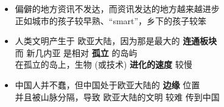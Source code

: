 \begin{preview}
\begin{minipage}{\textwidth}
\begin{itemize}
\begin{equation}
		\nonumber
		\end{equation}
	\item 偏僻的地方资讯不发达，而资讯发达的地方越来越进步 \\
		正如城市的孩子较早熟、``smart''，乡下的孩子较笨
	\item 人类文明产生于 欧亚大陆，因为那是最大的 \textbf{连通板块} \\
		而 新几内亚 是相对 \textbf{孤立} 的岛屿 \\
		在孤立的岛上，生物 (或技术) \textbf{进化的速度} 较慢
	\item 中国人并不蠢，但中国处于欧亚大陆的 \textbf{边缘} 位置 \\
		并且被山脉分隔，导致 欧亚大陆的文明 较难 传到中国
\end{itemize}

\end{minipage}
\end{preview}

